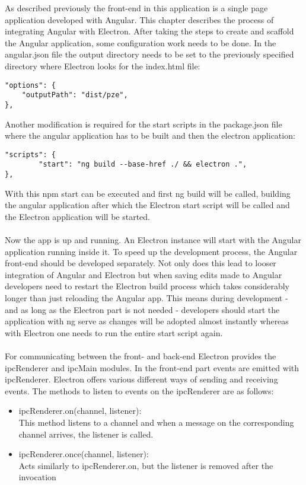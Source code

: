 
As described previously the front-end in this application is a single page application developed with Angular.
This chapter describes the process of integrating Angular with Electron. 
After taking the steps to create and scaffold the Angular application, some configuration work needs to be done.
In the angular.json file the output directory needs to be set to the previously specified directory where 
Electron looks for the index.html file:
\begin{lstlisting}
"options": {
    "outputPath": "dist/pze",
},
\end{lstlisting}
Another modification is required for the start scripts in the package.json file where the angular application has to be built 
and then the electron application:
\begin{lstlisting}
"scripts": {
        "start": "ng build --base-href ./ && electron .",
},
\end{lstlisting}
With this npm start can be executed and first ng build will be called, building the angular application after which the 
Electron start script will be called and the Electron application will be started.\paragraph{}
Now the app is up and running. 
An Electron instance will start with the Angular application running inside it. 
To speed up the development process, the Angular front-end should be developed separately. 
Not only does this lead to looser integration of Angular and Electron but when saving edits made to Angular 
developers need to restart the Electron build process which takes considerably longer than just reloading 
the Angular app. 
This means during development - and as long as the Electron part is not needed - developers should start the 
application with ng serve as changes will be adopted almost instantly whereas with Electron one needs to run the 
entire start script again.\paragraph{}
For communicating between the front- and back-end Electron provides the ipcRenderer and ipcMain modules.
In the front-end part events are emitted with ipcRenderer. 
Electron offers various different ways of sending and receiving events.
The methods to listen to events on the ipcRenderer are as follows: \parencite{electronDocs}
\begin{itemize}
    \item ipcRenderer.on(channel, listener):\\
    This method listens to a channel and when a message on the corresponding 
    channel arrives, the listener is called.
    \item ipcRenderer.once(channel, listener):\\
    Acts similarly to ipcRenderer.on, but the listener is removed after the invocation
\end{itemize}
